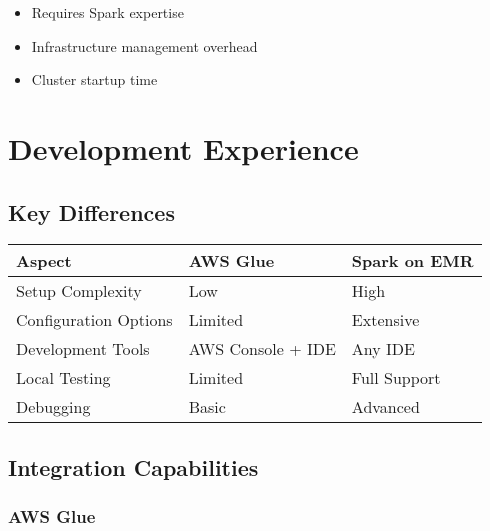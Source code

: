 \documentclass[
  letterpaper,
  DIV=11,
  numbers=noendperiod]{scrartcl}
\providecommand{\tightlist}{%
  \setlength{\itemsep}{0pt}\setlength{\parskip}{0pt}}\usepackage{longtable,booktabs,array}
\begin{document}
\begin{tcolorbox}[enhanced jigsaw, colbacktitle=quarto-callout-warning-color!10!white, coltitle=black, toprule=.15mm, colback=white, bottomrule=.15mm, colframe=quarto-callout-warning-color-frame, left=2mm, leftrule=.75mm, opacityback=0, toptitle=1mm, opacitybacktitle=0.6, bottomtitle=1mm, titlerule=0mm, rightrule=.15mm, title=\textcolor{quarto-callout-warning-color}{\faExclamationTriangle}\hspace{0.5em}{EMR Performance Limitations}, breakable, arc=.35mm]

\begin{itemize}
\tightlist
\item
  Requires Spark expertise
\item
  Infrastructure management overhead
\item
  Cluster startup time
\end{itemize}

\end{tcolorbox}

\section{Development Experience}\label{development-experience}

\subsection{Key Differences}\label{key-differences}

\begin{longtable}[]{@{}lll@{}}
\toprule\noalign{}
Aspect & AWS Glue & Spark on EMR \\
\midrule\noalign{}
\endhead
\bottomrule\noalign{}
\endlastfoot
Setup Complexity & Low & High \\
Configuration Options & Limited & Extensive \\
Development Tools & AWS Console + IDE & Any IDE \\
Local Testing & Limited & Full Support \\
Debugging & Basic & Advanced \\
\end{longtable}

\subsection{Integration Capabilities}\label{integration-capabilities}

\subsubsection{AWS Glue}
\end{document}
